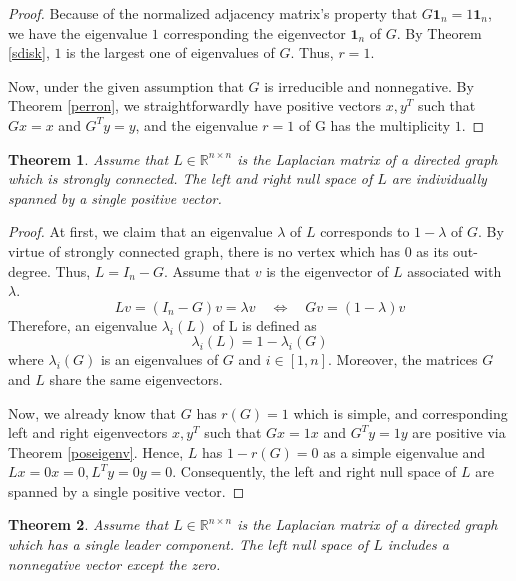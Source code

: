 \documentclass[11pt, a4paper, oneside, openany, reqno]{book}
\newtheorem{theorem}{Theorem}[chapter]
\theoremstyle{definition}
\theoremstyle{remark}
\numberwithin{equation}{chapter} %
\newcommand{\R}{\ensuremath{{\mathbb R}}}
\newcommand{\ONE}{\textbf{1}}
\begin{document}
\begin{proof}
	Because of the normalized adjacency matrix's property that $ G \ONE_n = 1 \ONE_n $, 
	we have the eigenvalue $ 1 $ corresponding the eigenvector $ \ONE_n $ of $ G $.
	By Theorem \ref{sdisk}, $ 1 $ is the largest one of eigenvalues of $ G $. 
	Thus, $ r =1 $.	
	
	Now, under the given assumption that $ G $ is irreducible and nonnegative.	
	By Theorem \ref{perron}, we straightforwardly have positive vectors $ x, y^T $
	such that $ Gx=x $ and $ G^T y=y $, 
	and the eigenvalue $ r=1 $ of G has the multiplicity $ 1 $.
\end{proof}

\begin{theorem}\label{nullspan}
	Assume that $ L \in \R^{n \times n}$ is the Laplacian matrix of a directed graph 
	which is strongly connected.
	The left and right null space of $ L $ are 
	individually spanned by a single positive vector.
\end{theorem}

\begin{proof}	
	At first, we claim that 
	an eigenvalue $ \lambda $ of $ L $ corresponds to $ 1-\lambda $	of $ G $.
	By virtue of strongly connected graph, there is no vertex which has $ 0 $ as its out-degree.
	Thus, $ L=I_n -G $. Assume that $ v $ is the eigenvector of $ L $ associated with $ \lambda $.
	\begin{equation}
		Lv= (I_n-G)v=\lambda v \quad \Leftrightarrow \quad Gv=(1-\lambda)v
	\end{equation}
	Therefore, an eigenvalue $ \lambda_i(L) $ of L is defined as
	\begin{equation}
		\lambda_i(L) = 1 - \lambda_i(G)
	\end{equation}
	where $ \lambda_i(G) $ is an eigenvalues of $ G $ and $ i \in [1,n] $.
	Moreover, the matrices $ G $ and $ L $ share the same eigenvectors.

	Now, we already know that $ G $ has $ r(G)=1 $ which is simple,
	and corresponding left and right eigenvectors
	$ x, y^T $ such that $ Gx=1x $ and $ G^T y=1y $ are positive via Theorem \ref{poseigenv}.
	Hence, $ L $ has $ 1-r(G)=0 $ as a simple eigenvalue  and $ Lx=0x=0, L^Ty=0y=0 $.
	Consequently, the left and right null space of $ L $ are spanned by a single positive vector. 	
\end{proof}	

\begin{theorem}\label{singleleader}
	Assume that $ L \in \R^{n \times n}$ is the Laplacian matrix of a directed graph 
	which has a single leader component.
	The left null space of $ L $ includes a nonnegative vector except the zero.
\end{theorem}
\end{document}
